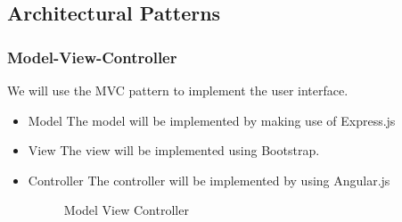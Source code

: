 \subsection{Architectural Patterns}
\subsubsection{Model-View-Controller}
We will use the MVC pattern to implement the user interface.
\begin{itemize}
	\item{Model}
	\newline
	The model will be implemented by making use of Express.js
	\item{View}
	\newline
	The view will be implemented using Bootstrap.
	\item{Controller}
	\newline
	The controller will be implemented by using Angular.js
	\begin{figure}[H]
	    	\centering
	    	\caption{Model View Controller}
	    	\label{fig:Learning rate 0.1}
   	\end{figure}
\end{itemize}